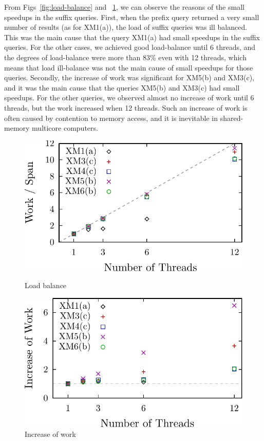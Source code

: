 From Figs~\ref{fig:load-balance} and ~\ref{fig:increase-of-work}, we can observe
the reasons of the small speedups in the suffix queries. First, when the prefix
query returned a very small number of results (as for XM1(a)), the load of
suffix queries was ill balanced. This was the main cause that the query XM1(a)
had small speedups in the suffix queries. For the other cases, we achieved good
load-balance until 6 threads, and the degrees of load-balance were more than
83\% even with 12 threads, which means that load ill-balance was not the main
cause of small speedups for those queries. Secondly, the increase of work was
significant for XM5(b) and XM3(c), and it was the main cause that the queries
XM5(b) and XM3(c) had small speedups. For the other queries, we observed almost
no increase of work until 6 threads, but the work increased when 12 threads.
Such an increase of work is often caused by contention to memory access, and it
is inevitable in shared-memory multicore computers.

\begin{figure}[t]
 \begin{minipage}{.48\linewidth}
  \includegraphics[width=.98\linewidth]{basex/exp_results/load_balance.pdf}
  \caption{Load balance}
  \label{fig:load-balance}
 \end{minipage}
 \hfill
 \begin{minipage}{.48\linewidth}
  \includegraphics[width=.98\linewidth]{basex/exp_results/increase_of_work.pdf}
  \caption{Increase of work}
  \label{fig:increase-of-work}
 \end{minipage}
\end{figure}

